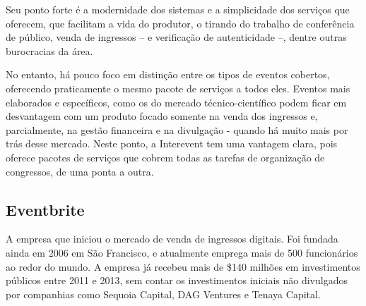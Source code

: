\documentclass[a4paper]{abntex2}
\begin{document}
Seu ponto forte é a modernidade dos sistemas e a simplicidade dos serviços que oferecem, que facilitam a vida do produtor, o tirando do trabalho de conferência de público, venda de ingressos -- e verificação de autenticidade --, dentre outras burocracias da área.

No entanto, há pouco foco em distinção entre os tipos de eventos cobertos, oferecendo praticamente o mesmo pacote de serviços a todos eles. Eventos mais elaborados e específicos, como os do mercado técnico-científico podem ficar em desvantagem com um produto focado somente na venda dos ingressos e, parcialmente, na gestão financeira e na divulgação - quando há muito mais por trás desse mercado. Neste ponto, a Interevent tem uma vantagem clara, pois oferece pacotes de serviços que cobrem todas as tarefas de organização de congressos, de uma ponta a outra.

\subsection{Eventbrite}
A empresa que iniciou o mercado de venda de ingressos digitais. Foi fundada ainda em 2006 em São Francisco, e atualmente emprega mais de 500 funcionários ao redor do mundo. A empresa já recebeu mais de \$140 milhões em investimentos públicos entre 2011 e 2013, sem contar os investimentos iniciais não divulgados por companhias como Sequoia Capital, DAG Ventures e Tenaya Capital. \cite{eventbrite-wiki}
\end{document}
